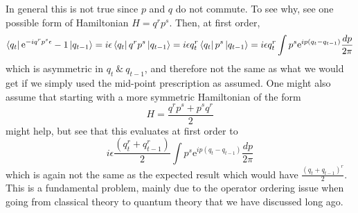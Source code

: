 \documentclass[11pt]{article}
\newcommand{\e}{\mathrm{e}}
\numberwithin{equation}{section}
\begin{document}
In general this is not true since \(p\) and \(q\) do not commute. To see why, see one possible form of Hamiltonian \(H = q^r p^s\). Then, at first order, 
\begin{equation*}
    \bra{q_t} \e^{-iq^r p^s\epsilon} -1\ket{q_{t-1}} = i\epsilon\bra{q_t} q^r p^s\ket{q_{t-1}} = i\epsilon q_t^r \bra{q_t} p^s\ket{q_{t-1}} = i\epsilon q_t^r \int p^s \e^{ip(q_t - q_{t-1})}\frac{dp}{2\pi}
\end{equation*}
which is asymmetric in \(q_t ~\& ~q_{t-1}\), and therefore not the same as what we would get if we simply used the mid-point prescription as assumed. One might also assume that starting with a more symmetric Hamiltonian of the form 
\begin{equation*}
    H = \frac{q^r p^s + p^s q^r}{2}
\end{equation*}
might help, but see that this evaluates at first order to 
\begin{equation*}
    i\epsilon \frac{(q_t^r + q_{t-1}^r)}{2} \int p^s \e^{ip(q_t - q_{t-1})}\frac{dp}{2\pi}
\end{equation*}
which is again not the same as the expected result which would have \(\displaystyle \frac{(q_t + q_{t-1})^r}{2}\).\\
This is a fundamental problem, mainly due to the operator ordering issue when going from classical theory to quantum theory that we have discussed long ago.\\
\end{document}
